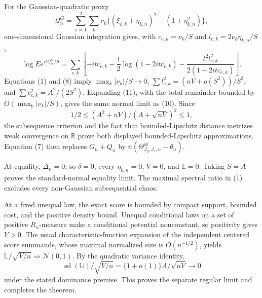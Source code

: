 For the Gaussian-quadratic proxy
\[
\mathcal Q_n^G=\sum_{e=1}^2\sum_k\nu_k
\{(\xi_{e,k}+\eta_{k,n})^2-(1+\eta_{k,n}^2)\},
\]
one-dimensional Gaussian integration gives, with \(c_{e,k}=\nu_k/S\) and \(l_{e,k}=2\nu_k\eta_{k,n}/S\),
\[
\log Ee^{it\mathcal Q_n^G/S}
=\sum_{e,k}\left[-itc_{e,k}-\frac12\log(1-2itc_{e,k})
-\frac{t^2l_{e,k}^2}{2(1-2itc_{e,k})}\right]. \tag{11}
\]
Equations (1) and (8) imply \(\max_k|\nu_k|/S\to0\), \(\sum l_{e,k}^2=(nV+o(S^2))/S^2\), and \(\sum c_{e,k}^2=A^2/(2S^2)\).  Expanding (11), with the total remainder bounded by \(O(\max_k|\nu_k|/S)\), gives the same normal limit as (10).  Since
\[
1/2\le(A^2+nV)/(A+\sqrt{nV})^2\le1, \tag{12}
\]
the subsequence criterion and the fact that bounded-Lipschitz distance metrizes weak convergence on \(\mathbb R\) prove both displayed bounded-Lipschitz approximations.  Equation (7) then replaces \(G_n+Q_n\) by \(n(\Theta^{\mathrm{or}}_{J_y,J_z,n}-\theta_n)\).

At equality, \(\Delta_n=0\), so \(\delta=0\), every \(\eta_{k,n}=0\), \(V=0\), and \(\mathbb L=0\).  Taking \(S=A\) proves the standard-normal equality limit.  The maximal spectral ratio in (1) excludes every non-Gaussian subsequential chaos.

At a fixed unequal law, the exact score is bounded by compact support, bounded cost, and the positive density bound.  Unequal conditional laws on a set of positive \(R_n\)-measure make a conditional potential nonconstant, so positivity gives \(V>0\).  The usual characteristic-function expansion of the independent centered score summands, whose maximal normalized size is \(O(n^{-1/2})\), yields \(\mathbb L/\sqrt{V/n}\Rightarrow\mathcal N(0,1)\).  By the quadratic variance identity,
\[
\operatorname{sd}(\mathbb U)/\sqrt{V/n}
=\{1+o(1)\}A/\sqrt{nV}\to0
\]
under the stated dominance premise.  This proves the separate regular limit and completes the theorem.
